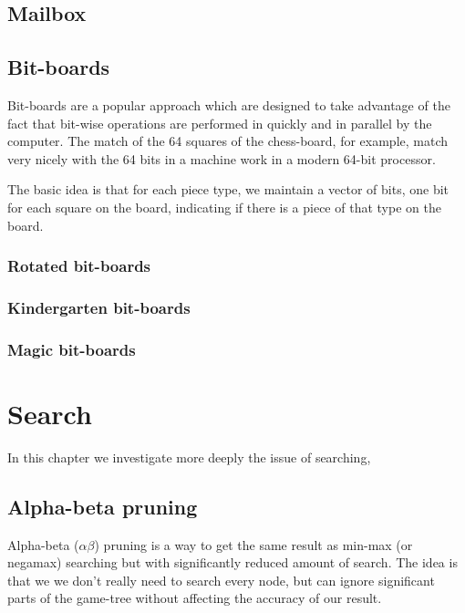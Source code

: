 \documentclass[10pt,dvipdfmx]{report}
\newcommand{\ab}{{$\alpha\beta$}}
\begin{document}
\section{Mailbox}

\section{Bit-boards}

Bit-boards are a popular approach which are designed to take advantage
of the fact that bit-wise operations are performed in quickly and in parallel
by the computer.  The match of the 64 squares of the chess-board, for example,
match very nicely with the 64 bits in a machine work in a modern 64-bit processor.

The basic idea is that for each piece type, we maintain a vector of bits, one bit
for each square on the board, indicating if there is a piece of that type on the
board.

\subsection{Rotated bit-boards}
\subsection{Kindergarten bit-boards}
\subsection{Magic bit-boards}


\chapter{Search}
\label{chap-search}

In this chapter we investigate more deeply the issue of searching,

\section{Alpha-beta pruning}
Alpha-beta (\ab) pruning is a way to get the same result
as min-max (or negamax) searching but with significantly reduced amount of search.
The idea is that we we don't really need to search every node, but can ignore significant
parts of the game-tree without affecting the accuracy of our result.
\end{document}
